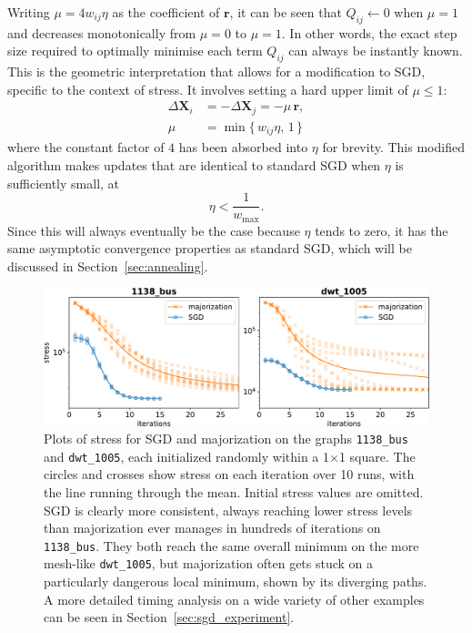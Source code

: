 Writing $\mu=4w_{ij}\eta$ as the coefficient of $\mathbf{r}$, it can be seen that $Q_{ij}\leftarrow 0$ when $\mu=1$ and decreases monotonically from $\mu=0$ to $\mu=1$.
In other words, the exact step size required to optimally minimise each term $Q_{ij}$ can always be instantly known. This is the geometric interpretation that allows for a modification to SGD, specific to the context of stress. It involves setting a hard upper limit of $\mu\leq 1$:
\begin{equation}
  \begin{aligned}
    \Delta\mathbf{X}_i &= -\Delta\mathbf{X}_j = -\mu\, \mathbf{r},\\
    \mu&=\min\{\,w_{ij}\eta, \, 1\,\}
  \end{aligned}
  \label{eq:mu}
\end{equation}
where the constant factor of $4$ has been absorbed into $\eta$ for brevity.
This modified algorithm makes updates that are identical to standard SGD when $\eta$ is sufficiently small, at
\begin{equation}
  \eta<\frac{1}{w_{\max}}.
  \label{eq:eta-sufficiently-small}
\end{equation}
Since this will always eventually be the case because $\eta$ tends to zero, it has the same asymptotic convergence properties as standard SGD, which will be discussed in Section~\ref{sec:annealing}.

\begin{figure}
  \centering
  \includegraphics[width=.9\textwidth]{stress/iterations.pdf}
  \caption[Results against majorization for \texttt{1138\_bus} and \texttt{dwt\_1005}]{Plots of stress for SGD and majorization on the graphs \texttt{1138\_bus} and \texttt{dwt\_1005}, each initialized randomly within a 1$\times$1 square.
  The circles and crosses show stress on each iteration over 10 runs, with the line running through the mean.
  Initial stress values are omitted.
  SGD is clearly more consistent, always reaching lower stress levels than majorization ever manages in hundreds of iterations on \texttt{1138\_bus}.
  They both reach the same overall minimum on the more mesh-like \texttt{dwt\_1005}, but majorization often gets stuck on a particularly dangerous local minimum, shown by its diverging paths.
  A more detailed timing analysis on a wide variety of other examples can be seen in Section~\ref{sec:sgd_experiment}.
  }
  \label{fig:stress_plots}
\end{figure}

